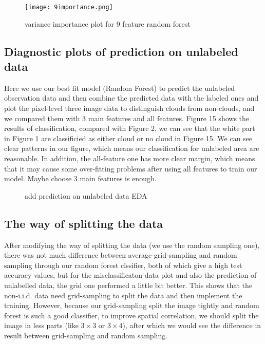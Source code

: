\documentclass[12pt]{extarticle}
\begin{document}
\begin{figure}[htb]
	\centering
	\texttt{[image: 9importance.png]}
	\caption{variance importance plot for 9 feature random forest}\label{fig 2}
\end{figure}

\subsection{Diagnostic plots of prediction on unlabeled data}
Here we use our best fit model (Random Forest) to predict the unlabeled observation data and then combine the predicted data with the labeled ones and plot the pixel-level three image data to distinguish clouds from non-clouds, and we compared them with 3 main features and all features. Figure 15 shows the results of classification, compared with Figure 2, we can see that the white part in Figure 1 are classificied as either cloud or no cloud in Figure 15. We can see clear patterns in our figure, which means our classification for unlabeled area are reasonable. In addition, the all-feature one has more clear margin, which means that it may cause some over-fitting problems after using all features to train our model. Maybe choose 3 main features is enough.
\begin{figure}[htb]
\centering
{}
\quad
{}
\caption{add prediction on unlabeled data EDA}\label{fig 1}
\end{figure}



\subsection{The way of splitting the data}
After modifying the way of splitting the data (we use the random sampling one), there was not much difference between average-grid-sampling and random sampling through our random forest clssifier, both of which give a high test accuracy values, but for the misclassificaton data plot and also the prediction of unlabelled data, the grid one performed a little bit better. This shows that the non-i.i.d. data need grid-sampling to split the data and then implement the training. However, because our grid-sampling split the image tightly and random forest is such a good classifier, to improve spatial correlation, we should split the image in less parts (like $3\times 3$ or $3\times 4$), after which we would see the difference in result between grid-sampling and random sampling. 
\end{document}
